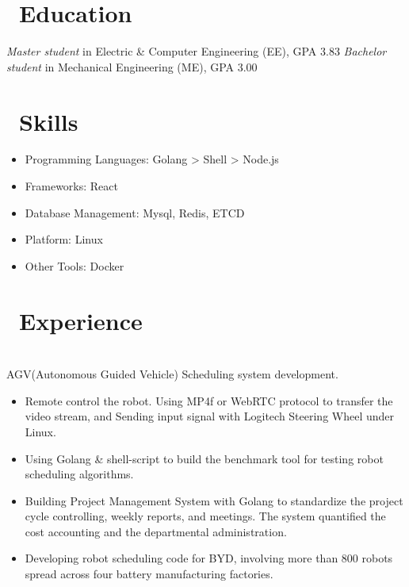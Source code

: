 \documentclass{resume}
\begin{document}



\section{\faGraduationCap\ Education}
\textit{Master student} in Electric \& Computer Engineering (EE), GPA 3.83
\textit{Bachelor student} in Mechanical Engineering (ME), GPA 3.00

\section{\faCogs\ Skills}
\begin{itemize}[parsep=0.5ex]
  \item Programming Languages: Golang > Shell > Node.js
  \item Frameworks: React
  \item Database Management: Mysql, Redis, ETCD
  \item Platform: Linux
  \item Other Tools: Docker
\end{itemize}

\section{\faUsers\ Experience}
\role{Software engineer}
\\AGV(Autonomous Guided Vehicle) Scheduling system development.
\begin{itemize}
  \item Remote control the robot. Using MP4f or WebRTC protocol to transfer the video stream, and Sending input signal with Logitech Steering Wheel under Linux.
  \item Using Golang \& shell-script to build the benchmark tool for testing robot scheduling algorithms.
  \item Building Project Management System with Golang to standardize the project cycle controlling, weekly reports, and meetings. The system quantified the cost accounting and the departmental administration.
  \item Developing robot scheduling code for BYD, involving more than 800 robots spread across four battery manufacturing factories.
\end{itemize}
\end{document}
